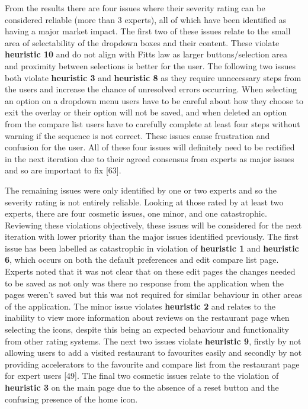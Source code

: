 \documentclass[a4 paper, 12pt]{article}
\begin{document}
     From the results there are four issues where their severity rating can be considered reliable (more than 3 experts), all of which have been identified as having a major market impact. The first two of these issues relate to the small area of selectability of the dropdown boxes and their content. These violate \textbf{heuristic 10} and do not align with Fitts law as larger buttons/selection area and proximity between selections is better for the user. The following two issues both violate \textbf{heuristic 3} and \textbf{heuristic 8} as they require unnecessary steps from the users and increase the chance of unresolved errors occurring. When selecting an option on a dropdown menu users have to be careful about how they choose to exit the overlay or their option will not be saved, and when deleted an option from the compare list users have to carefully complete at least four steps without warning if the sequence is not correct. These issues cause frustration and confusion for the user. All of these four issues will definitely need to be rectified in the next iteration due to their agreed consensus from experts as major issues and so are important to fix [63].

     The remaining issues were only identified by one or two experts and so the severity rating is not entirely reliable. Looking at those rated by at least two experts, there are four cosmetic issues, one minor, and one catastrophic. Reviewing these violations objectively, these issues will be considered for the next iteration with lower priority than the major issues identified previously. The first issue has been labelled as catastrophic in violation of \textbf{heuristic 1} and \textbf{heuristic 6}, which occurs on both the default preferences and edit compare list page. Experts noted that it was not clear that on these edit pages the changes needed to be saved as not only was there no response from the application when the pages weren't saved but this was not required for similar behaviour in other areas of the application. The minor issue violates \textbf{heuristic 2} and relates to the inability to view more information about reviews on the restaurant page when selecting the icons, despite this being an expected behaviour and functionality from other rating systems. The next two issues violate \textbf{heuristic 9}, firstly by not allowing users to add a visited restaurant to favourites easily and secondly by not providing accelerators to the favourite and compare list from the restaurant page for expert users [49]. The final two cosmetic issues relate to the violation of \textbf{heuristic 3} on the main page due to the absence of a reset button and the confusing presence of the home icon. 
          
\end{document}
